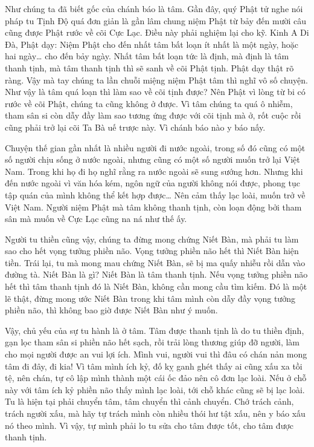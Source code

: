 \documentclass[
  12pt,
  oneside]{book}
\begin{document}
Như chúng ta đã biết gốc của chánh báo là tâm. Gần đây, quý Phật tử nghe nói pháp tu Tịnh Độ quá đơn giản là gần lâm chung niệm Phật từ bảy đến mười câu cũng được Phật rước về cõi Cực Lạc. Điều này phải nghiệm lại cho kỹ. Kinh A Di Đà, Phật dạy: Niệm Phật cho đến nhất tâm bất loạn ít nhất là một ngày, hoặc hai ngày\ldots{} cho đến bảy ngày. Nhất tâm bất loạn tức là định, mà định là tâm thanh tịnh, mà tâm thanh tịnh thì sẽ sanh về cõi Phật tịnh. Phật dạy thật rõ ràng. Vậy mà tay chúng ta lần chuỗi miệng niệm Phật tâm thì nghĩ vô số chuyện. Như vậy là tâm quá loạn thì làm sao về cõi tịnh được? Nên Phật vì lòng từ bi có rước về cõi Phật, chúng ta cũng không ở được. Vì tâm chúng ta quá ô nhiễm, tham sân si còn dẫy đầy làm sao tương ứng được với cõi tịnh mà ở, rốt cuộc rồi cũng phải trở lại cõi Ta Bà uế trược này. Vì chánh báo nào y báo nấy.

Chuyện thế gian gần nhất là nhiều người đi nước ngoài, trong số đó cũng có một số người chịu sống ở nước ngoài, nhưng cũng có một số người muốn trở lại Việt Nam. Trong khi họ đi họ nghĩ rằng ra nước ngoài sẽ sung sướng hơn. Nhưng khi đến nước ngoài vì văn hóa kém, ngôn ngữ của người không nói được, phong tục tập quán của mình không thể kết hợp được\ldots{} Nên cảm thấy lạc loài, muốn trở về Việt Nam. Người niệm Phật mà tâm không thanh tịnh, còn loạn động bởi tham sân mà muốn về Cực Lạc cũng na ná như thế ấy.

Người tu thiền cũng vậy, chúng ta đừng mong chứng Niết Bàn, mà phải tu làm sao cho hết vọng tưởng phiền não. Vọng tưởng phiền não hết thì Niết Bàn hiện tiền. Trái lại, tu mà mong mau chứng Niết Bàn, sẽ bị ma quấy nhiễu rồi dẫn vào đường tà. Niết Bàn là gì? Niết Bàn là tâm thanh tịnh. Nếu vọng tưởng phiền não hết thì tâm thanh tịnh đó là Niết Bàn, không cần mong cầu tìm kiếm. Đó là một lẽ thật, đừng mong ước Niết Bàn trong khi tâm mình còn dẫy đầy vọng tưởng phiền não, thì không bao giờ được Niết Bàn như ý muốn.

Vậy, chủ yếu của sự tu hành là ở tâm. Tâm được thanh tịnh là do tu thiền định, gạn lọc tham sân si phiền não hết sạch, rồi trải lòng thương giúp đỡ người, làm cho mọi người được an vui lợi ích. Mình vui, người vui thì đâu có chán nản mong tâm đi đây, đi kia! Vì tâm mình ích kỷ, đố kỵ ganh ghét thấy ai cũng xấu xa tồi tệ, nên chán, tự cô lập mình thành một cái ốc đảo nên cô đơn lạc loài. Nếu ở chỗ này với tâm ích kỷ phiền não thấy mình lạc loài, tới chỗ khác cũng sẽ bị lạc loài. Tu là hiện tại phải chuyển tâm, tâm chuyển thì cảnh chuyển. Chớ trách cảnh, trách người xấu, mà hãy tự trách mình còn nhiều thói hư tật xấu, nên y báo xấu nó theo mình. Vì vậy, tự mình phải lo tu sửa cho tâm được tốt, cho tâm được thanh tịnh.
\end{document}
